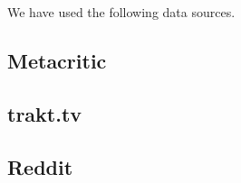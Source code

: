 We have used the following data sources.

\subsection{Metacritic}
\label{sec:data:metacritic}

\subsection{trakt.tv}
\label{sec:data:trakt}

\subsection{Reddit}
\label{sec:data:reddit}

